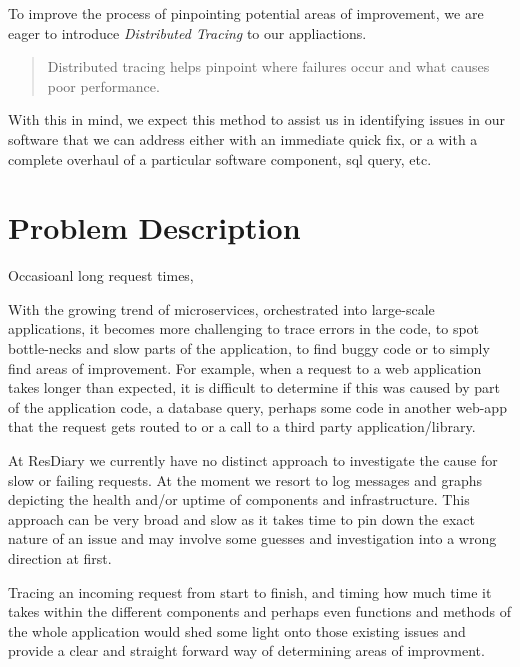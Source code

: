 \documentclass[11pt]{article}
\begin{document}
To improve the process of pinpointing potential areas of improvement, we are eager to introduce \textit{Distributed Tracing} to our appliactions.
\begin{quote}
    Distributed tracing helps pinpoint where failures occur and what causes poor performance. \cite{opentracing.io/docs}
\end{quote}  
With this in mind, we expect this method to assist us in identifying issues in our software that we can address either with an immediate quick fix, or a with a complete overhaul of a particular software component, sql query, etc.

\section{Problem Description}


Occasioanl long request times, 

With the growing trend of microservices, orchestrated into large-scale applications, it becomes more challenging to trace errors in the code, to spot bottle-necks and slow parts of the application, to find buggy code or to simply find areas of improvement. For example, when a request to a web application takes longer than expected, it is difficult to determine if this was caused by part of the application code, a database query, perhaps some code in another web-app that the request gets routed to or a call to a third party application/library.

At ResDiary we currently have no distinct approach to investigate the cause for slow or failing requests. At the moment we resort to log messages and graphs depicting the health and/or uptime of components and infrastructure. This approach can be very broad and slow as it takes time to pin down the exact nature of an issue and may involve some guesses and investigation into a wrong direction at first. 





Tracing an incoming request from start to finish, and timing how much time it takes within the different components and perhaps even functions and methods of the whole application would shed some light onto those existing issues and provide a clear and straight forward way of determining areas of improvment.
\end{document}
